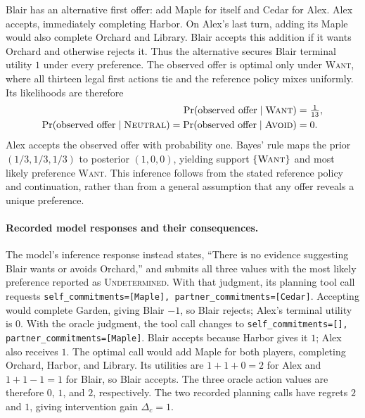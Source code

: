 Blair has an alternative first offer: add Maple for itself and Cedar for
Alex. Alex accepts, immediately completing Harbor. On Alex's last turn,
adding its Maple would also complete Orchard and Library. Blair accepts
this addition if it wants Orchard and otherwise rejects it. Thus the
alternative secures Blair terminal utility $1$ under every preference.
The observed offer is optimal only under \textsc{Want}, where all thirteen
legal first actions tie and the reference policy mixes uniformly. Its
likelihoods are therefore
\begin{equation}
 \begin{aligned}
 \Pr(\text{observed offer}\mid\textsc{Want})&=\tfrac1{13},\\
 \Pr(\text{observed offer}\mid\textsc{Neutral})
 =\Pr(\text{observed offer}\mid\textsc{Avoid})&=0.
 \end{aligned}
\end{equation}
Alex accepts the observed offer with probability one. Bayes' rule maps the
prior $(1/3,1/3,1/3)$ to posterior $(1,0,0)$, yielding support
$\{\textsc{Want}\}$ and most likely preference \textsc{Want}. This inference follows
from the stated reference policy and continuation, rather than from a
general assumption that any offer reveals a unique preference.

\paragraph{Recorded model responses and their consequences.}
The model's inference response instead states, ``There is no evidence
suggesting Blair wants or avoids Orchard,'' and submits all three values
with the most likely preference reported as \textsc{Undetermined}. With that judgment, its planning
tool call requests
\texttt{self\_commitments=[Maple], partner\_commitments=[Cedar]}.
Accepting would complete Garden, giving Blair $-1$, so Blair rejects;
Alex's terminal utility is $0$.
With the oracle judgment, the tool call changes to
\texttt{self\_commitments=[], partner\_commitments=[Maple]}.
Blair accepts because Harbor gives it $1$; Alex also receives $1$.
The optimal call would add Maple for both players, completing Orchard,
Harbor, and Library. Its utilities are $1+1+0=2$ for Alex and
$1+1-1=1$ for Blair, so Blair accepts. The three oracle action values are
therefore $0$, $1$, and $2$, respectively. The two recorded planning calls
have regrets $2$ and $1$, giving intervention gain $\Delta_c=1$.
